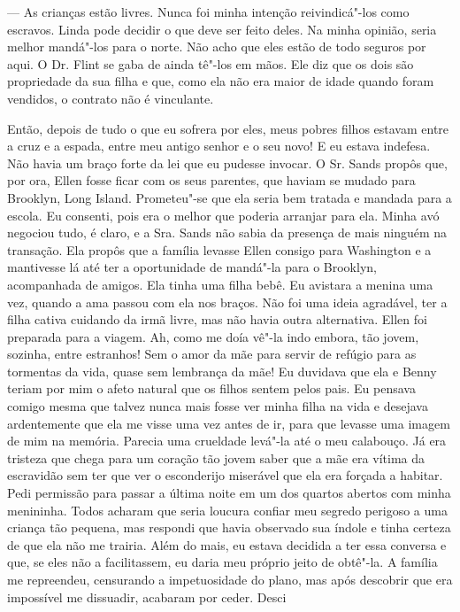 --- As crianças estão livres. Nunca foi minha intenção reivindicá"-los
como escravos. Linda pode decidir o que deve ser feito deles. Na minha
opinião, seria melhor mandá"-los para o norte. Não acho que eles estão de
todo seguros por aqui. O Dr. Flint se gaba de ainda tê"-los em mãos. Ele
diz que os dois são propriedade da sua filha e que, como ela não era
maior de idade quando foram vendidos, o contrato não é vinculante.

Então, depois de tudo o que eu sofrera
por eles, meus pobres filhos estavam entre a cruz e a espada, entre meu
antigo senhor e o seu novo! E eu estava indefesa. Não havia um braço
forte da lei que eu pudesse invocar. O Sr. Sands propôs que, por ora,
Ellen fosse ficar com os seus parentes, que haviam se mudado para
Brooklyn, Long Island. Prometeu"-se que ela seria bem tratada e mandada
para a escola. Eu consenti, pois era o melhor que poderia arranjar para
ela. Minha avó negociou tudo, é claro, e a Sra. Sands não sabia da
presença de mais ninguém na transação. Ela propôs que a família levasse
Ellen consigo para Washington e a mantivesse lá até ter a oportunidade
de mandá"-la para o Brooklyn, acompanhada de amigos. Ela tinha uma filha
bebê. Eu avistara a menina uma vez, quando a ama passou com ela nos
braços. Não foi uma ideia agradável, ter a filha cativa cuidando da irmã
livre, mas não havia outra alternativa. Ellen foi preparada para a
viagem. Ah, como me doía vê"-la indo embora, tão jovem, sozinha, entre
estranhos! Sem o amor da mãe para servir de refúgio para as tormentas da
vida, quase sem lembrança da mãe! Eu duvidava que ela e Benny teriam por
mim o afeto natural que os filhos sentem pelos pais. Eu pensava comigo
mesma que talvez nunca mais fosse ver minha filha na vida e desejava
ardentemente que ela me visse uma vez antes de ir, para que levasse uma
imagem de mim na memória. Parecia uma crueldade levá"-la até o meu
calabouço. Já era tristeza que chega para um coração tão jovem saber que
a mãe era vítima da escravidão sem ter que ver o esconderijo miserável
que ela era forçada a habitar. Pedi permissão para passar a última noite
em um dos quartos abertos com minha menininha. Todos acharam que seria
loucura confiar meu segredo perigoso a uma criança tão pequena, mas
respondi que havia observado sua índole e tinha certeza de que ela não
me trairia. Além do mais, eu estava decidida a ter essa conversa e que,
se eles não a facilitassem, eu daria meu próprio jeito de obtê"-la. A
família me repreendeu, censurando a impetuosidade do plano, mas após
descobrir que era impossível me dissuadir, acabaram por ceder. Desci
